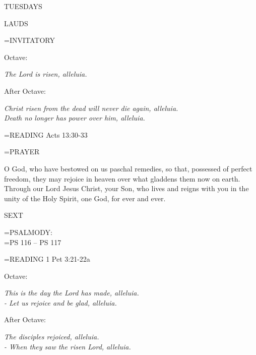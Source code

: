 \begin{center}\normalsize TUESDAYS\\
\end{center}

\begin{flushleft}\normalsize LAUDS\\\end{flushleft}

\hangindent=\parindent \small{INVITATORY}
\begin{center}
\end{center}Octave:\begin{center}\textit{	The Lord is risen, alleluia.\\}
\end{center}After Octave:\begin{center}\textit{	Christ risen from the dead will never die again, alleluia.\\}
\textit{Death no longer has power over him, alleluia.\\}
\end{center}

\hangindent=\parindent \small{\uppercase{READING}}    Acts 13:30-33 \textbf{   \\}

\hangindent=\parindent \small PRAYER
\begin{description}[labelindent=\parindent, leftmargin=*]
\item [Octave:] 	O God, who have bestowed on us paschal remedies, so that, possessed of perfect freedom, they may rejoice in heaven over what gladdens them now on earth. Through our Lord Jesus Christ, your Son, who lives and reigns with you in the unity of the Holy Spirit, one God, for ever and ever.
\item [After Octave:] 	
\end{description}

\begin{flushleft}\normalsize SEXT\\\end{flushleft}

\hangindent=\parindent \small{PSALMODY:}\\
\hangindent=\parindent  PS 116 -- PS 117\vspace{0.5em}

\hangindent=\parindent \small{\uppercase{READING}}    1 Pet 3:21-22a \textbf{   \\}

\begin{center}
\end{center}Octave:\begin{center}\textit{	This is the day the Lord has made, alleluia.\\
- Let us rejoice and be glad, alleluia.}
\end{center}After Octave:\begin{center}\textit{	The disciples rejoiced, alleluia.\\
- When they saw the risen Lord, alleluia.}
\end{center}

